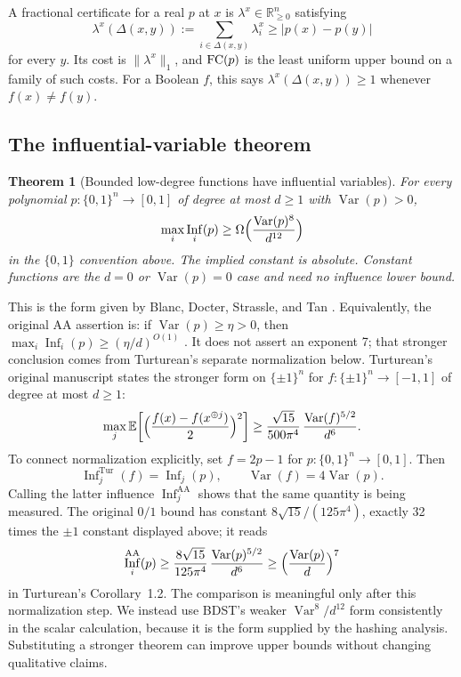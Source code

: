 \documentclass[11pt]{article}
\newtheorem{theorem}{Theorem}[section]
\theoremstyle{definition}\newtheorem{definition}[theorem]{Definition}
\theoremstyle{remark}\newtheorem{remark}[theorem]{Remark}
\newcommand{\E}{\mathbb E}\newcommand{\Prb}{\mathbb P}
\DeclareMathOperator{\Inf}{Inf}\DeclareMathOperator{\Var}{Var}
\begin{document}
A fractional certificate for a real \(p\) at \(x\) is \(\lambda^x\in\mathbb R^n_{\ge0}\) satisfying
\[
 \lambda^x(\Delta(x,y)):=\sum_{i\in\Delta(x,y)}\lambda^x_i\ge|p(x)-p(y)|
\]
for every \(y\). Its cost is \(\|\lambda^x\|_1\), and \(\operatorname{FC}(p)\) is the least uniform upper bound on a family of such costs. For a Boolean \(f\), this says \(\lambda^x(\Delta(x,y))\ge1\) whenever \(f(x)\ne f(y)\).

\subsection{The influential-variable theorem}
\begin{theorem}[Bounded low-degree functions have influential variables]\label{thm:aa}
For every polynomial \(p:\{0,1\}^n\to[0,1]\) of degree at most \(d\ge1\) with \(\Var(p)>0\),
\[
 \max_i\Inf_i(p)\ge\Omega\Bigl(\frac{\Var(p)^8}{d^{12}}\Bigr)
\]
in the \(\{0,1\}\) convention above. The implied constant is absolute. Constant functions are the \(d=0\) or \(\Var(p)=0\) case and need no influence lower bound.
\end{theorem}
This is the form given by Blanc, Docter, Strassle, and Tan \cite[Theorem~1]{BDST26}. Equivalently, the original AA assertion is: if \(\Var(p)\ge\eta>0\), then \(\max_i\Inf_i(p)\ge(\eta/d)^{O(1)}\) \cite[Conjecture~6 (arXiv version)]{AA14}. It does not assert an exponent 7; that stronger conclusion comes from Turturean's separate normalization below. Turturean's original manuscript \cite{Tur26} states the stronger form on \(\{\pm1\}^n\) for \(f:\{\pm1\}^n\to[-1,1]\) of degree at most \(d\ge1\):
\[
 \max_j\E\biggl[\Bigl(\frac{f(x)-f(x^{\oplus j})}{2}\Bigr)^2\biggr]\ge\frac{\sqrt{15}}{500\pi^4}\,\frac{\Var(f)^{5/2}}{d^6}.
\]
To connect normalization explicitly, set \(f=2p-1\) for \(p:\{0,1\}^n\to[0,1]\). Then
\[
 \Inf^{\mathrm{Tur}}_j(f)=\Inf_j(p),\qquad \Var(f)=4\Var(p).
\]
Calling the latter influence \(\Inf^{\mathrm{AA}}_j\) shows that the same quantity is being measured. The original \(0/1\) bound has constant \(8\sqrt{15}/(125\pi^4)\), exactly 32 times the \(\pm1\) constant displayed above; it reads
\[
 \Inf^{\mathrm{AA}}_i(p)\ge\frac{8\sqrt{15}}{125\pi^4}\,\frac{\Var(p)^{5/2}}{d^6}\ge\Bigl(\frac{\Var(p)}{d}\Bigr)^7
\]
in Turturean's Corollary~1.2. The comparison is meaningful only after this normalization step. We instead use BDST's weaker \(\Var^8/d^{12}\) form consistently in the scalar calculation, because it is the form supplied by the hashing analysis. Substituting a stronger theorem can improve upper bounds without changing qualitative claims.
\end{document}

